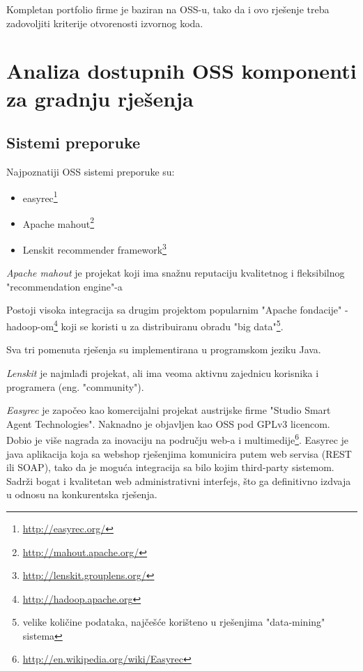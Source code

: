 \documentclass[times, utf8, seminar]{fit}
\begin{document}
Kompletan portfolio firme je baziran na OSS-u, tako da i ovo rješenje treba zadovoljiti kriterije otvorenosti izvornog koda.

\chapter{Analiza dostupnih OSS komponenti za gradnju rješenja}
\vspace*{-0.7cm}

\section{Sistemi preporuke}

Najpoznatiji OSS sistemi preporuke su:

\begin{itemize}
  \item easyrec\footnote{\url{http://easyrec.org/}}
  \item Apache mahout\footnote{\url{http://mahout.apache.org/}}
  \item Lenskit recommender framework\footnote{\url{http://lenskit.grouplens.org/}}
\end{itemize}

\emph{Apache mahout} je projekat koji ima snažnu reputaciju kvalitetnog i fleksibilnog "recommendation engine"-a 

Postoji visoka integracija sa drugim projektom popularnim "Apache fondacije" - hadoop-om\footnote{\url{http://hadoop.apache.org}} koji se koristi u za distribuiranu obradu "big data"\footnote{velike količine podataka, najčešće korišteno u  rješenjima "data-mining" sistema}.

Sva tri pomenuta rješenja su implementirana u programskom jeziku Java.

\emph{Lenskit} je najmlađi projekat, ali ima veoma aktivnu zajednicu korisnika i programera (eng. "community").

\emph{Easyrec} je započeo kao komercijalni projekat austrijske firme "Studio Smart Agent Technologies". Naknadno je objavljen kao OSS pod GPLv3 licencom. 
Dobio je više nagrada za inovaciju na području web-a i multimedije\footnote{\url{http://en.wikipedia.org/wiki/Easyrec}}. 
Easyrec je java aplikacija koja sa webshop rješenjima komunicira putem web servisa (REST ili SOAP), tako da je moguća integracija sa bilo kojim third-party sistemom.
Sadrži bogat i kvalitetan web administrativni interfejs, što ga definitivno izdvaja u odnosu na konkurentska rješenja.
\end{document}
